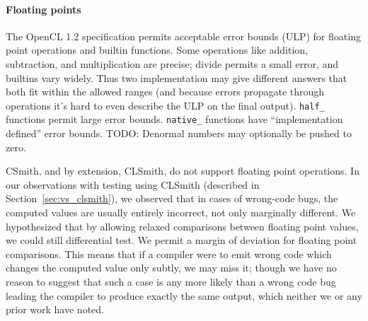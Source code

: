 \paragraph{Floating points} The OpenCL 1.2 specification permits acceptable error bounds (ULP) for floating point operations and builtin functions. Some operations like addition, subtraction, and multiplication are precise; divide permits a small error, and builtins vary widely. Thus two implementation may give different answers that both fit within the allowed ranges (and because errors propagate through operations it's hard to even describe the ULP on the final output). \texttt{half\_} functions permit large error bounds. \texttt{native\_} functions have ``implementation defined'' error bounds. TODO: Denormal numbers may optionally be pushed to zero.

CSmith, and by extension, CLSmith, do not support floating point operations. In our observations with testing using CLSmith (described in Section~\ref{sec:vs_clsmith}), we observed that in cases of wrong-code bugs, the computed values are usually entirely incorrect, not only marginally different. We hypothesized that by allowing relaxed comparisons between floating point values, we could still differential test. We permit a margin of deviation for floating point comparisons. This means that if a compiler were to emit wrong code which changes the computed value only subtly, we may miss it; though we have no reason to suggest that such a case is any more likely than a wrong code bug leading the compiler to produce exactly the same output, which neither we or any prior work have noted.

